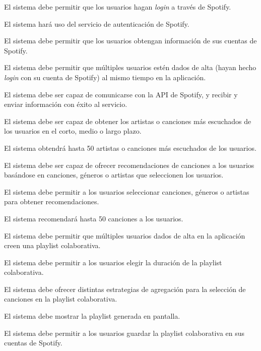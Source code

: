 \begin{functional}
    \item El sistema debe permitir que los usuarios hagan \textit{login} a través de Spotify.
    \begin{functional}
        \item El sistema hará uso del servicio de autenticación de Spotify.
    \end{functional}
    \item El sistema debe permitir que los usuarios obtengan información de sus cuentas de Spotify.
    \item El sistema debe permitir que múltiples usuarios estén dados de alta (hayan hecho \textit{login} con su cuenta de Spotify) al 
    mismo tiempo en la aplicación.
    \item El sistema debe ser capaz de comunicarse con la API de Spotify, y recibir y enviar información con éxito al servicio.
    \item El sistema debe ser capaz de obtener los artistas o canciones más escuchados de los usuarios en el corto, medio o largo plazo.
    \begin{functional}
        \item El sistema obtendrá hasta 50 artistas o canciones más escuchados de los usuarios.
    \end{functional} 
    \item El sistema debe ser capaz de ofrecer recomendaciones de canciones a los usuarios basándose en canciones, géneros o artistas que seleccionen los usuarios.
    \begin{functional}
        \item El sistema debe permitir a los usuarios seleccionar canciones, géneros o artistas para obtener recomendaciones.
        \item El sistema recomendará hasta 50 canciones a los usuarios.
    \end{functional} 
    \item El sistema debe permitir que múltiples usuarios dados de alta en la aplicación creen una playlist colaborativa.
    \begin{functional}
        \item El sistema debe permitir a los usuarios elegir la duración de la playlist colaborativa.
        \item El sistema debe ofrecer distintas estrategias de agregación para la selección de canciones en la playlist colaborativa.
        \item El sistema debe mostrar la playlist generada en pantalla.
        \item El sistema debe permitir a los usuarios guardar la playlist colaborativa en sus cuentas de Spotify.
    \end{functional}
\end{functional}

